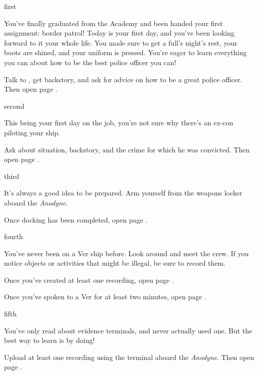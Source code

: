 \documentclass[greennotebook]{guildcamp4} %
\begin{document}
\startnotebook{\nCgoodNotebook{}}

\begin{page}{first}

You've finally graduated from the Academy and been handed your first assignment: border patrol! Today is your first day, and you've been looking forward to it your whole life. You made sure to get a full's night's rest, your boots are shined, and your uniform is pressed. You're eager to learn everything you can about how to be the best police officer you can!

Talk to \cCbad{}, get  backstory, and ask for  advice on how to be a great police officer. Then open page .

\end{page}

\begin{page}{second}

This being your first day on the job, you're not sure why there's an ex-con piloting your ship. 

Ask \cPilot{} about  situation,  backstory, and the crime for which he was convicted. Then open page .

\end{page}

\begin{page}{third}

It's always a good idea to be prepared. Arm yourself from the weapons locker aboard the \emph{Anodyne}.

Once docking has been completed, open page .

\end{page}

\begin{page}{fourth}

You've never been on a Ver ship before. Look around and meet the crew. If you notice objects or activities that might be illegal, be sure to record them.

Once you've created at least one recording, open page .

Once you've spoken to a Ver for at least two minutes, open page .

\end{page}

\begin{page}{fifth}

You've only read about evidence terminals, and never actually used one. But the best way to learn is by doing!

Upload at least one recording using the terminal aboard the \emph {Anodyne}. Then open page .

\end{page}
\end{document}
